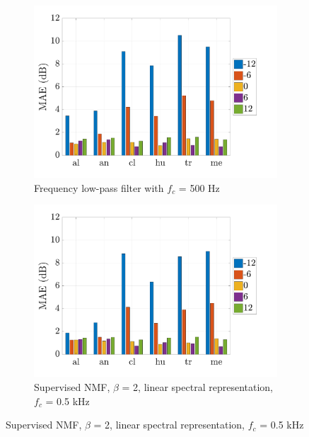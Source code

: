 \documentclass[twocolumn,a4paper,10pt]{article}
\begin{document}
\begin{figure}
    \centering
    \begin{subfigure}[t]{0.45\textwidth}
        \centering
        \includegraphics[width=\linewidth]{../image/filter_bar.pdf}
        \caption{Frequency low-pass filter with $f_c$ = 500 Hz}
        \label{fig:TIR_class_filter}
    \end{subfigure}%
    \hfill
    \begin{subfigure}[t]{0.45\textwidth}
        \centering
        \includegraphics[width=\linewidth]{../image/sup_bar.pdf}
        \caption{Supervised NMF, $\beta$ = 2, linear spectral representation, $f_c$ = 0.5 kHz}
                \label{fig:TIR_class_sup}
    \end{subfigure}
    

\end{figure}
\end{document}
